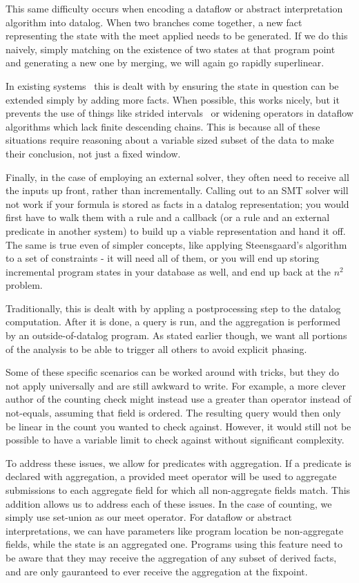 This same difficulty occurs when encoding a dataflow or abstract interpretation algorithm into datalog.
When two branches come together, a new fact representing the state with the meet applied needs to be generated.
If we do this naively, simply matching on the existence of two states at that program point and generating a new one by merging, we will again go rapidly superlinear.

In existing systems~\cite{doop1} this is dealt with by ensuring the state in question can be extended simply by adding more facts.
When possible, this works nicely, but it prevents the use of things like strided intervals~\cite{vsa} or widening operators in dataflow algorithms which lack finite descending chains.
This is because all of these situations require reasoning about a variable sized subset of the data to make their conclusion, not just a fixed window.

Finally, in the case of employing an external solver, they often need to receive all the inputs up front, rather than incrementally.
Calling out to an SMT solver will not work if your formula is stored as facts in a datalog representation; you would first have to walk them with a rule and a callback (or a rule and an external predicate in another system) to build up a viable representation and hand it off.
The same is true even of simpler concepts, like applying Steensgaard's algorithm~\cite{steensgaard-alias} to a set of constraints - it will need all of them, or you will end up storing incremental program states in your database as well, and end up back at the $n^2$ problem.

Traditionally, this is dealt with by appling a postprocessing step to the datalog computation.
After it is done, a query is run, and the aggregation is performed by an outside-of-datalog program.
As stated earlier though, we want all portions of the analysis to be able to trigger all others to avoid explicit phasing.

Some of these specific scenarios can be worked around with tricks, but they do not apply universally and are still awkward to write.
For example, a more clever author of the counting check might instead use a greater than operator instead of not-equals, assuming that field is ordered.
The resulting query would then only be linear in the count you wanted to check against.
However, it would still not be possible to have a variable limit to check against without significant complexity.

To address these issues, we allow for predicates with aggregation.
If a predicate is declared with aggregation, a provided meet operator will be used to aggregate submissions to each aggregate field for which all non-aggregate fields match.
This addition allows us to address each of these issues.
In the case of counting, we simply use set-union as our meet operator.
For dataflow or abstract interpretations, we can have parameters like program location be non-aggregate fields, while the state is an aggregated one.
Programs using this feature need to be aware that they may receive the aggregation of any subset of derived facts, and are only gauranteed to ever receive the aggregation at the fixpoint.


